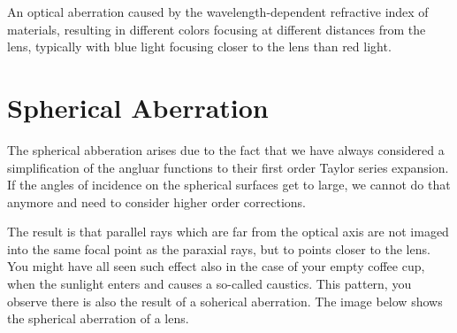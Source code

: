 \documentclass[
  a4paper,
]{book}
\begin{document}
\begin{tcolorbox}[enhanced jigsaw, coltitle=black, title=\textcolor{quarto-callout-note-color}{\faInfo}\hspace{0.5em}{Chromatic Aberration}, colframe=quarto-callout-note-color-frame, toprule=.15mm, opacitybacktitle=0.6, left=2mm, opacityback=0, breakable, toptitle=1mm, bottomtitle=1mm, leftrule=.75mm, arc=.35mm, titlerule=0mm, colbacktitle=quarto-callout-note-color!10!white, rightrule=.15mm, bottomrule=.15mm, colback=white]

An optical aberration caused by the wavelength-dependent refractive
index of materials, resulting in different colors focusing at different
distances from the lens, typically with blue light focusing closer to
the lens than red light.

\end{tcolorbox}

\section{Spherical Aberration}\label{spherical-aberration}

The spherical abberation arises due to the fact that we have always
considered a simplification of the angluar functions to their first
order Taylor series expansion. If the angles of incidence on the
spherical surfaces get to large, we cannot do that anymore and need to
consider higher order corrections.

The result is that parallel rays which are far from the optical axis are
not imaged into the same focal point as the paraxial rays, but to points
closer to the lens. You might have all seen such effect also in the case
of your empty coffee cup, when the sunlight enters and causes a
so-called caustics. This pattern, you observe there is also the result
of a soherical aberration. The image below shows the spherical
aberration of a lens.
\end{document}
